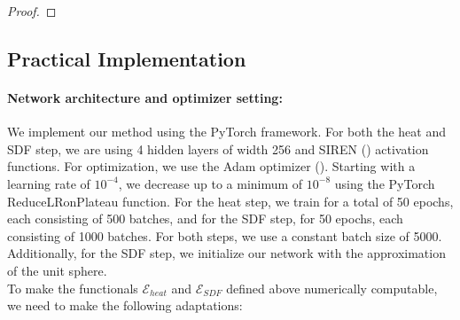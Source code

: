 \documentclass[12pt,openany]{book}
\def\S{\mathcal{S}}
\theoremstyle{plainnormal}
\theoremstyle{remark}
\begin{document}
\begin{proof}
    
\end{proof}
\subsection{Practical Implementation}\label{practicalImplememntation}
\paragraph{Network architecture and optimizer setting:} We implement our method using the PyTorch framework. For both the heat and SDF step, we are using 4 hidden layers of width 256 and SIREN (\cite{sitzmann2020implicitneuralrepresentationsperiodic}) activation functions. For optimization, we use the Adam optimizer (\cite{kingma2017adammethodstochasticoptimization}). Starting with a learning rate of $10^{-4}$, we decrease up to a minimum of $10^{-8}$ using the PyTorch ReduceLRonPlateau function. For the heat step, we train for a total of 50 epochs, each consisting of 500 batches, and for the SDF step, for 50 epochs, each consisting of 1000 batches. For both steps, we use a constant batch size of 5000. Additionally, for the SDF step, we initialize our network with the approximation of the unit sphere. \\
To make the functionals $\mathcal{E}_{heat}$ and $\mathcal{E}_{SDF}$ defined above numerically computable, we need to make the following adaptations:
\end{document}
